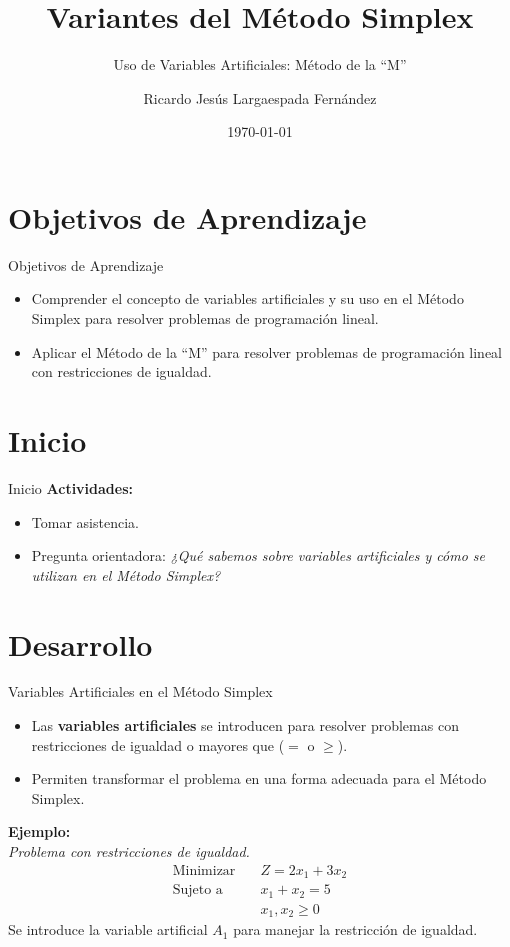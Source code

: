 \documentclass{beamer}
\title{Variantes del Método Simplex}
\subtitle{Uso de Variables Artificiales: Método de la ``M''}
\author[Ricardo Largaespada]{Ricardo Jesús Largaespada Fernández}
\institute[UNI]{Ingeniería de Sistemas, DACTIC, UNI}
\date{\today}
\begin{document}
\frame{\titlepage}

\section{Objetivos de Aprendizaje}

\begin{frame}{Objetivos de Aprendizaje}
    \begin{itemize}
        \item Comprender el concepto de variables artificiales y su uso en el Método Simplex para resolver problemas de programación lineal.
        \item Aplicar el Método de la ``M'' para resolver problemas de programación lineal con restricciones de igualdad.
    \end{itemize}
\end{frame}

\section{Inicio}

\begin{frame}{Inicio}
    \textbf{Actividades:}
    \begin{itemize}
        \item Tomar asistencia.
        \item Pregunta orientadora: \textit{¿Qué sabemos sobre variables artificiales y cómo se utilizan en el Método Simplex?}
    \end{itemize}
\end{frame}

\section{Desarrollo}

\begin{frame}{Variables Artificiales en el Método Simplex}
    \begin{itemize}
        \item Las \textbf{variables artificiales} se introducen para resolver problemas con restricciones de igualdad o mayores que ($= \text{ o }\ge$).
        \item Permiten transformar el problema en una forma adecuada para el Método Simplex.
    \end{itemize}
    \pause
    \textbf{Ejemplo:} \\
    \textit{Problema con restricciones de igualdad.}
    \begin{align*}
        \text{Minimizar} & \quad Z = 2x_1 + 3x_2 \\
        \text{Sujeto a} & \quad x_1 + x_2 = 5 \\
        & \quad x_1, x_2 \geq 0
    \end{align*}
    \pause
    Se introduce la variable artificial \( A_1 \) para manejar la restricción de igualdad.
\end{frame}
\end{document}
